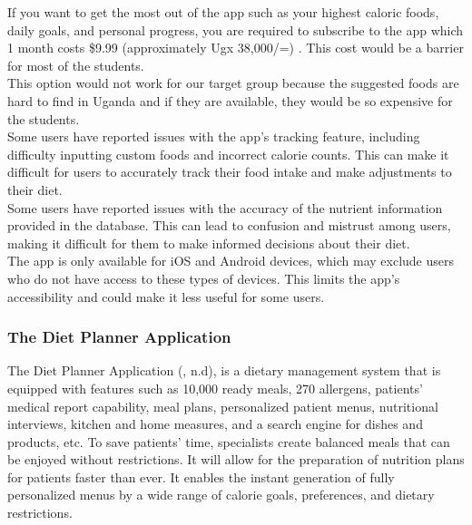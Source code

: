 \documentclass {article}
\begin{document}
\noindent If you want to get the most out of the app such as your highest caloric foods, daily goals, and personal progress, you are required to subscribe to the app which 1 month costs \$9.99 (approximately Ugx 38,000/=) . This cost would be a barrier for most of the students.\\

\noindent This option would not work for our target group because the suggested foods are hard to find in Uganda and if they are available, they would be so expensive for the students.\\

\noindent Some users have reported issues with the app’s tracking feature, including difficulty inputting custom foods and incorrect calorie counts. This can make it difficult for users to accurately track their food intake and make adjustments to their diet.\\

\noindent Some users have reported issues with the accuracy of the nutrient information provided in the database. This can lead to confusion and mistrust among users, making it difficult for them to make informed decisions about their diet.\\

\noindent The app is only available for iOS and Android devices, which may exclude users who do not have access to these types of devices. This limits the app's accessibility and could make it less useful for some users.\\

\subsubsection{The Diet Planner Application}

\noindent The Diet Planner Application (, n.d), is a dietary management system that is equipped with features such as 10,000 ready meals, 270 allergens, patients' medical report capability, meal plans, personalized patient menus, nutritional interviews, kitchen and home measures, and a search engine for dishes and products, etc. To save patients' time, specialists create balanced meals that can be enjoyed without restrictions. It will allow for the preparation of nutrition plans for patients faster than ever. It enables the instant generation of fully personalized menus by a wide range of calorie goals, preferences, and dietary restrictions.\\
\end{document}
